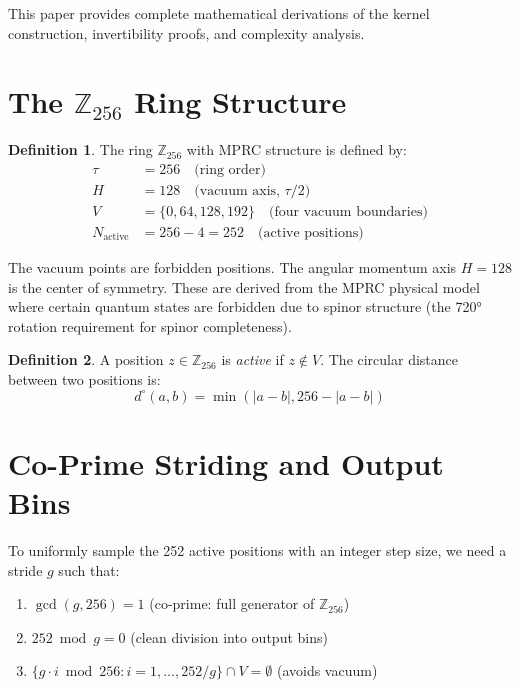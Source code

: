 \documentclass[12pt,a4paper]{article}
\theoremstyle{definition}
\newtheorem{definition}{Definition}
\begin{document}
This paper provides complete mathematical derivations of the kernel construction, invertibility proofs, and complexity analysis.

\section{The $\mathbb{Z}_{256}$ Ring Structure}

\begin{definition}
The ring $\mathbb{Z}_{256}$ with MPRC structure is defined by:
\begin{align}
\tau &= 256 \quad \text{(ring order)} \\
H &= 128 \quad \text{(vacuum axis, $\tau/2$)} \\
V &= \{0, 64, 128, 192\} \quad \text{(four vacuum boundaries)} \\
N_{\text{active}} &= 256 - 4 = 252 \quad \text{(active positions)}
\end{align}
\end{definition}

The vacuum points are forbidden positions. The angular momentum axis $H = 128$ is the center of symmetry. These are derived from the MPRC physical model where certain quantum states are forbidden due to spinor structure (the 720° rotation requirement for spinor completeness).

\begin{definition}
A position $z \in \mathbb{Z}_{256}$ is \emph{active} if $z \notin V$. The circular distance between two positions is:
\[
d^{\circ}(a, b) = \min(|a - b|, 256 - |a - b|)
\]
\end{definition}

\section{Co-Prime Striding and Output Bins}

To uniformly sample the 252 active positions with an integer step size, we need a stride $g$ such that:

\begin{enumerate}
    \item $\gcd(g, 256) = 1$ (co-prime: full generator of $\mathbb{Z}_{256}$)
    \item $252 \bmod g = 0$ (clean division into output bins)
    \item $\{g \cdot i \bmod 256 : i = 1, \ldots, 252/g\} \cap V = \emptyset$ (avoids vacuum)
\end{enumerate}
\end{document}
